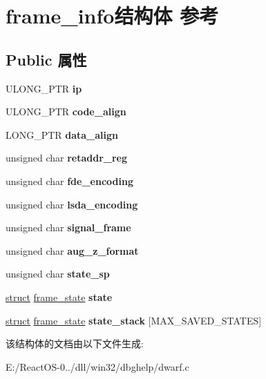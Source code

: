 \hypertarget{structframe__info}{}\section{frame\+\_\+info结构体 参考}
\label{structframe__info}
\subsection*{Public 属性}
\begin{DoxyCompactItemize}
\item 
\mbox{\label{structframe__info_a4bf040987398a7d43929bd39c2201ec7}} 
U\+L\+O\+N\+G\+\_\+\+P\+TR {\bfseries ip}
\item 
\mbox{\label{structframe__info_addfabda1f931c5dafd0024249d1fa40c}} 
U\+L\+O\+N\+G\+\_\+\+P\+TR {\bfseries code\+\_\+align}
\item 
\mbox{\label{structframe__info_a0484b0385eee86220241c42f0f7d013e}} 
L\+O\+N\+G\+\_\+\+P\+TR {\bfseries data\+\_\+align}
\item 
\mbox{\label{structframe__info_ad3380bd212ed723c2a2a3473d38126d5}} 
unsigned char {\bfseries retaddr\+\_\+reg}
\item 
\mbox{\label{structframe__info_ad513f2c2fcc36916b7467219a6c07b0d}} 
unsigned char {\bfseries fde\+\_\+encoding}
\item 
\mbox{\label{structframe__info_a1a2a74afac600c45cc407ab46cc34e0e}} 
unsigned char {\bfseries lsda\+\_\+encoding}
\item 
\mbox{\label{structframe__info_a648dc396fa55a735f7b19b0134992467}} 
unsigned char {\bfseries signal\+\_\+frame}
\item 
\mbox{\label{structframe__info_ac3c6a3dafb1378c45849e97327d40949}} 
unsigned char {\bfseries aug\+\_\+z\+\_\+format}
\item 
\mbox{\label{structframe__info_ab5aba441c1ad4f43c83ffaa0af3f3722}} 
unsigned char {\bfseries state\+\_\+sp}
\item 
\mbox{\label{structframe__info_a2ee6ed520abaa79c94abe113cb9d0f17}} 
\hyperlink{interfacestruct}{struct} \hyperlink{structframe__state}{frame\+\_\+state} {\bfseries state}
\item 
\mbox{\label{structframe__info_a0c772c29c6bc5f3135accf4c45c2d054}} 
\hyperlink{interfacestruct}{struct} \hyperlink{structframe__state}{frame\+\_\+state} {\bfseries state\+\_\+stack} \mbox{[}M\+A\+X\+\_\+\+S\+A\+V\+E\+D\+\_\+\+S\+T\+A\+T\+ES\mbox{]}
\end{DoxyCompactItemize}


该结构体的文档由以下文件生成\+:\begin{DoxyCompactItemize}
\item 
E\+:/\+React\+O\+S-\/0../dll/win32/dbghelp/dwarf.\+c\end{DoxyCompactItemize}
